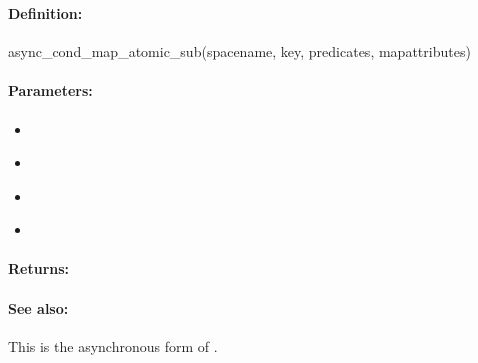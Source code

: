 \pagebreak
\subsubsection{}
\label{api:ruby:async_cond_map_atomic_sub}


\paragraph{Definition:}
\begin{rubycode}
async_cond_map_atomic_sub(spacename, key, predicates, mapattributes)
\end{rubycode}

\paragraph{Parameters:}
\begin{itemize}[noitemsep]
\item {}\\

\item {}\\

\item {}\\

\item {}\\

\end{itemize}

\paragraph{Returns:}


\paragraph{See also:}  This is the asynchronous form of .

\pagebreak
\subsubsection{}
\label{api:ruby:map_atomic_mul}


